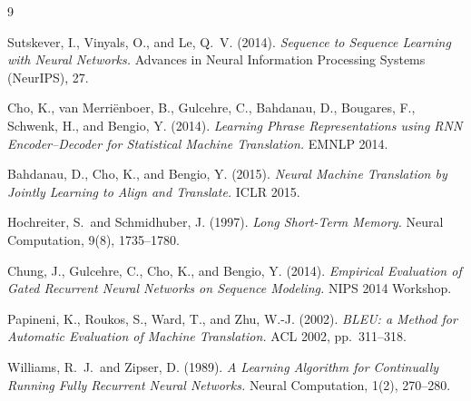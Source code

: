 \documentclass[12pt,a4paper]{article}
\begin{document}
\begin{thebibliography}{9}

Sutskever, I., Vinyals, O., and Le, Q.\ V. (2014).
\textit{Sequence to Sequence Learning with Neural Networks.}
Advances in Neural Information Processing Systems (NeurIPS), 27.

Cho, K., van Merri\"{e}nboer, B., Gulcehre, C., Bahdanau, D., Bougares, F.,
Schwenk, H., and Bengio, Y. (2014).
\textit{Learning Phrase Representations using RNN Encoder--Decoder for Statistical Machine Translation.}
EMNLP 2014.

Bahdanau, D., Cho, K., and Bengio, Y. (2015).
\textit{Neural Machine Translation by Jointly Learning to Align and Translate.}
ICLR 2015.

Hochreiter, S.\ and Schmidhuber, J. (1997).
\textit{Long Short-Term Memory.}
Neural Computation, 9(8), 1735--1780.

Chung, J., Gulcehre, C., Cho, K., and Bengio, Y. (2014).
\textit{Empirical Evaluation of Gated Recurrent Neural Networks on Sequence Modeling.}
NIPS 2014 Workshop.

Papineni, K., Roukos, S., Ward, T., and Zhu, W.-J. (2002).
\textit{BLEU: a Method for Automatic Evaluation of Machine Translation.}
ACL 2002, pp.\ 311--318.

Williams, R.\ J.\ and Zipser, D. (1989).
\textit{A Learning Algorithm for Continually Running Fully Recurrent Neural Networks.}
Neural Computation, 1(2), 270--280.

\end{thebibliography}
\end{document}
